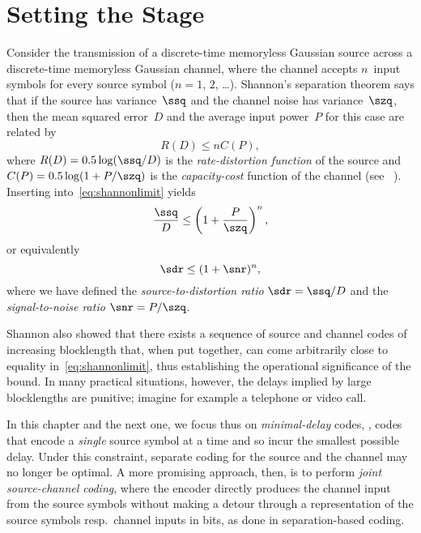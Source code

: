 \chapter{Setting the Stage}

Consider the transmission of a discrete-time memoryless Gaussian source across a
discrete-time memoryless Gaussian channel, where the channel accepts $n$~input
symbols for every source symbol ($n = 1$, $2$, \ldots). Shannon's separation
theorem says that if the source has variance~$\ssq$ and the channel noise has
variance~$\szq$, then the mean squared error~$D$ and the average input power~$P$
for this case are related by
\begin{equation}
  \label{eq:shannonlimit}
  R(D) \le n C(P),
\end{equation}
where $R(D) = 0.5 \log(\ssq/D)$ is the \emph{rate-distortion function} of the
source and $C(P) = 0.5 \log(1 + P/\szq)$ is the \emph{capacity-cost} function of
the channel (see \eg~\cite{CoverT1991}). Inserting into~\eqref{eq:shannonlimit}
yields
\begin{equation}
  \label{eq:shannonlimitgaussian}
  \frac{\ssq}{D} \le \left( 1 + \frac{P}{\szq} \right)^n,
\end{equation}
or equivalently
\begin{equation}
  \label{eq:shannonlimitsdr}
  \sdr \le (1 + \snr)^n,
\end{equation}
where we have defined the \emph{source-to-distortion ratio} $\sdr = \ssq /D$ and
the \emph{signal-to-noise ratio} $\snr = P/\szq$.

Shannon also showed that there exists a sequence of source and channel codes of
increasing blocklength that, when put together, can come arbitrarily close to
equality in~\eqref{eq:shannonlimit}, thus establishing the operational
significance of the bound. In many practical situations, however, the delays
implied by large blocklengths are punitive; imagine for example a telephone or
video call.

In this chapter and the next one, we focus thus on \emph{minimal-delay} codes,
\ie, codes that encode a \emph{single} source symbol at a time and so incur the
smallest possible delay.  Under this constraint, separate coding for the source
and the channel may no longer be optimal. A more promising approach, then, is to
perform \emph{joint source-channel coding}, where the encoder directly produces
the channel input from the source symbols without making a detour through a
representation of the source symbols resp.\ channel inputs in bits, as done in
separation-based coding.

